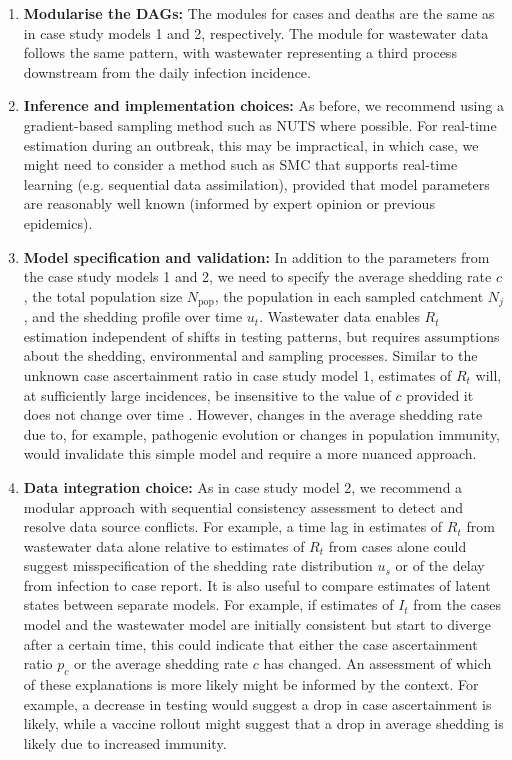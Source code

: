 \documentclass{article}
\begin{document}
\begin{enumerate}
\item \textbf{Modularise the DAGs:} The modules for cases and deaths are the same as in case study models 1 and 2, respectively. The module for wastewater data follows the same pattern, with wastewater representing a third process downstream from the daily infection incidence.
    
    \item \textbf{Inference and implementation choices:} As before, we recommend using a gradient-based sampling method such as \ac{NUTS} where possible. For real-time estimation during an outbreak, this may be impractical, in which case, we might need to consider a method such as \ac{SMC} that supports real-time learning (e.g. sequential data assimilation), provided that model parameters are reasonably well known (informed by expert opinion or previous epidemics).

    \item \textbf{Model specification and validation:} In addition to the parameters from the case study models 1 and 2, we need to specify the average shedding rate $c$, the total population size $N_\mathrm{pop}$, the population in each sampled catchment $N_j$, and the shedding profile over time $u_t$. Wastewater data enables $R_t$ estimation independent of shifts in testing patterns, but requires assumptions about the shedding, environmental and sampling processes. Similar to the unknown case ascertainment ratio in case study model 1, estimates of $R_t$ will, at sufficiently large incidences, be insensitive to the value of $c$ provided it does not change over time \citep{dreifuss2025estimated}. However, changes in the average shedding rate due to, for example, pathogenic evolution or changes in population immunity, would invalidate this simple model and require a more nuanced approach. 
    
    \item \textbf{Data integration choice:} As in case study model 2, we recommend a modular approach with sequential consistency assessment to detect and resolve data source conflicts. For example, a time lag in estimates of $R_t$ from wastewater data alone relative to estimates of $R_t$ from cases alone could suggest misspecification of the shedding rate distribution $u_s$ or of the delay from infection to case report.  It is also useful to compare estimates of latent states between separate models. For example, if estimates of $I_t$ from the cases model and the wastewater model are initially consistent but start to diverge after a certain time, this could indicate that either the case ascertainment ratio $p_c$ or the average shedding rate $c$ has changed. An assessment of which of these explanations is more likely might be informed by the context. For example, a decrease in testing would suggest a drop in case ascertainment is likely, while a vaccine rollout might suggest that a drop in average shedding is likely due to increased immunity. 


\end{enumerate}
\end{document}
